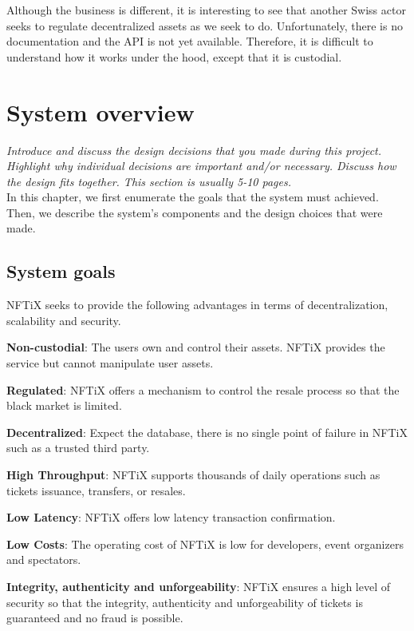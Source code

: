 \documentclass[a4paper,11pt,oneside]{report}
\begin{document}
Although the business is different, it is interesting to see that another Swiss actor seeks to regulate decentralized assets as we seek to do. Unfortunately, there is no documentation and the API is not yet available. Therefore, it is difficult to understand how it works under the hood, except that it is custodial.

\chapter{System overview}

\textit{Introduce and discuss the design decisions that you made during this project.
Highlight why individual decisions are important and/or necessary. Discuss
how the design fits together.
This section is usually 5-10 pages.} \\

In this chapter, we first enumerate the goals that the system must achieved. Then, we describe the system's components and the design choices that were made. 

\section{System goals}

NFTiX seeks to provide the following advantages in terms of decentralization, scalability and security.

\begin{description}
  \item \textbf{Non-custodial}: The users own and control their assets. NFTiX provides the service but cannot manipulate user assets.
  \item \textbf{Regulated}: NFTiX offers a mechanism to control the resale process so that the black market is limited.
  \item \textbf{Decentralized}: Expect the database, there is no single point of failure in NFTiX such as a trusted third party.
  \item \textbf{High Throughput}: NFTiX supports thousands of daily operations such as tickets issuance, transfers, or resales.
  \item \textbf{Low Latency}: NFTiX offers low latency transaction confirmation.
  \item \textbf{Low Costs}: The operating cost of NFTiX is low for developers, event organizers and spectators.
  \item \textbf{Integrity, authenticity and unforgeability}: NFTiX ensures a high level of security so that the integrity, authenticity and unforgeability of tickets is guaranteed and no fraud is possible.
\end{description}
\end{document}
